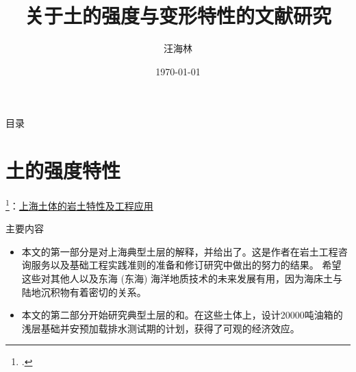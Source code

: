 


\title{关于土的强度与变形特性的文献研究}
\author{汪海林}
\date{\today}






\frame[plain]\titlepage

\begin{frame}[plain]{目录}
    \tableofcontents
\end{frame}

\section{土的强度特性}

\begin{frame}{\footcite{Gao1986}：\href{run:./papers/Gao1986-Geotechnical properties of Shanghai soils and engineering applications.pdf}{上海土体的岩土特性及工程应用}}
    \begin{block}{主要内容}
        \begin{itemize}
            \item 本文的第一部分是对上海典型土层的解释，并给出了。这是作者在岩土工程咨询服务以及基础工程实践准则的准备和修订研究中做出的努力的结果。 希望这些对其他人以及东海 (东海) 海洋地质技术的未来发展有用，因为海床土与陆地沉积物有着密切的关系。
            \item 本文的第二部分开始研究典型土层的和。在这些土体上，设计20000吨油箱的浅层基础并安预加载排水测试期的计划，获得了可观的经济效应。
        \end{itemize}
    \end{block}
\end{frame}

